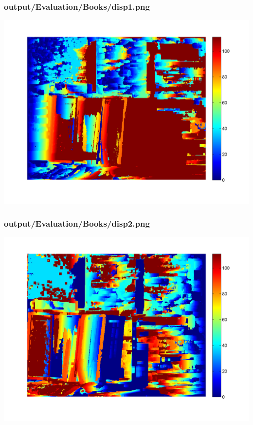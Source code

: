 \subsubsection{output/Evaluation/Books/disp1.png}
    \includegraphics[scale=0.5]{output/Evaluation/Books/disp1.png}

\subsubsection{output/Evaluation/Books/disp2.png}
    \includegraphics[scale=0.5]{output/Evaluation/Books/disp2.png}

